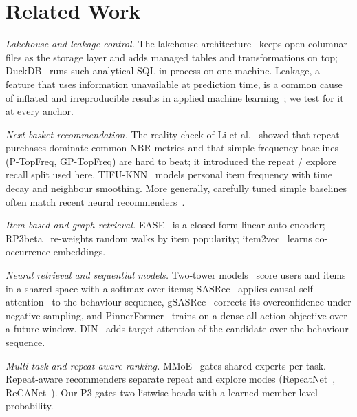 \documentclass{ieeeaccess}
\begin{document}
\section{Related Work}
\label{sec:related}

\textit{Lakehouse and leakage control.} The lakehouse architecture~\cite{armbrust2021lakehouse} keeps open columnar files as the
storage layer and adds managed tables and transformations on top; DuckDB~\cite{raasveldt2019duckdb} runs such analytical SQL in
process on one machine. Leakage, a feature that uses information unavailable at prediction time, is a common cause of inflated and
irreproducible results in applied machine learning~\cite{kapoor2023leakage}; we test for it at every anchor.

\textit{Next-basket recommendation.} The reality check of Li et al.~\cite{li2023nbr} showed that repeat purchases dominate common NBR
metrics and that simple frequency baselines (P-TopFreq, GP-TopFreq) are hard to beat; it introduced the repeat / explore recall split
used here. TIFU-KNN~\cite{hu2020tifu} models personal item frequency with time decay and neighbour smoothing. More generally,
carefully tuned simple baselines often match recent neural recommenders~\cite{dacrema2019progress}.

\textit{Item-based and graph retrieval.} EASE~\cite{steck2019ease} is a closed-form linear auto-encoder; RP3beta~\cite{paudel2017rp3beta}
re-weights random walks by item popularity; item2vec~\cite{barkan2016item2vec} learns co-occurrence embeddings.

\textit{Neural retrieval and sequential models.} Two-tower models~\cite{yi2019twotower} score users and items in a shared space with a
softmax over items; SASRec~\cite{kang2018sasrec} applies causal self-attention~\cite{vaswani2017attention} to the behaviour sequence,
gSASRec~\cite{petrov2023gsasrec} corrects its overconfidence under negative sampling, and PinnerFormer~\cite{pancha2022pinnerformer}
trains on a dense all-action objective over a future window. DIN~\cite{zhou2018din} adds target attention of the candidate over the
behaviour sequence.

\textit{Multi-task and repeat-aware ranking.} MMoE~\cite{ma2018mmoe} gates shared experts per task. Repeat-aware recommenders separate
repeat and explore modes (RepeatNet~\cite{ren2019repeatnet}, ReCANet~\cite{ariannezhad2022recanet}). Our P3 gates two listwise heads
with a learned member-level probability.
\end{document}
